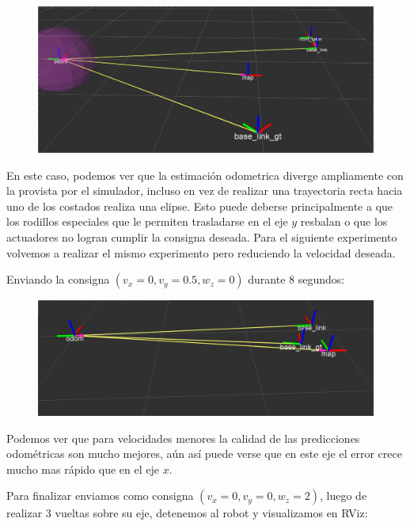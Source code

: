\begin{figure}[!htb]
\includegraphics[width=\linewidth]{pruebasOdom/8segIzquierda2.png}
\end{figure}

En este caso, podemos ver que la estimación odometrica diverge ampliamente con la provista por el simulador, incluso en vez de realizar una trayectoria recta hacia uno de los costados realiza una elipse. Esto puede deberse principalmente a que los rodillos especiales que le permiten trasladarse en el eje $y$ resbalan o que los actuadores no logran cumplir la consigna deseada. Para el siguiente experimento volvemos a realizar el mismo experimento pero reduciendo la velocidad deseada.

Enviando la consigna $(v_x = 0, v_y=0.5,w_z=0)$ durante 8 segundos: 

\begin{figure}[!htb]
\includegraphics[width=\linewidth]{pruebasOdom/8segIzquierda05.png}
\end{figure}

Podemos ver que para velocidades menores la calidad de las predicciones odométricas son mucho mejores, aún así puede verse que en este eje el error crece mucho mas rápido que en el eje $x$.

\pagebreak

Para finalizar enviamos como consigna $(v_x = 0, v_y=0,w_z=2)$, luego de realizar 3 vueltas sobre su eje, detenemos al robot y visualizamos en RViz:

